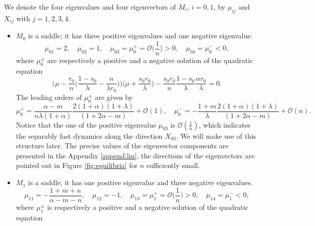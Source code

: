 \documentclass[a4paper,11pt]{article}
\def\BO{{\mathcal{O}}}
\theoremstyle{remark}
\begin{document}
We denote the four eigenvalues and four eigenvectors of $M_i$, $i=0,1$,  by $\mu_{ij}$ and $X_{ij}$ with $j=1,2,3,4$. %
\begin{itemize}
 \item $M_0$ is a saddle; it has three positive eigenvalues and one negative eigenvalue. 
 \begin{equation} \label{eq:eigM0}
  \mu_{01} = 2, \quad \mu_{02}=1, \quad \mu_{03}=\mu_0^+=\BO\Big(\frac{1}{n}\Big)>0, \quad \mu_{04}=\mu_0^{-}<0,
 \end{equation}
  where $\mu_0^\pm$ are respectively a positive and a negative solution of the quadratic equation
 $$ \Big(\mu - \frac{r_0}{n}\Big(\frac{1-s_0}{\lambda}-\frac{n}{\lambda r_0}\Big)\Big)\Big(\mu + \frac{s_0r_0}{\lambda}\Big) - \frac{s_0r_0}{n} \frac{1-s_0}{\lambda}\frac{\alpha r_0}{\lambda} = 0.$$
The leading orders of $\mu_0^\pm$ are given by
$$\mu_0^+ = \frac{\alpha-m}{n\lambda(1+\alpha)}\frac{2(1+\alpha)(1+\lambda)}{(1+2\alpha-m)}+\BO(1), \quad\mu_0^- = -\frac{1+m}{\lambda}\frac{2(1+\alpha)(1+\lambda)}{(1+2\alpha-m)}  + \BO(n).$$
Notice that the one of the positive eigenvalue $\mu_{03}$ is $\mathcal{O}( \frac{1}{n})$, which indicates the separably fast dynamics along the direction $X_{03}$. We will make use of this structure later.
The precise values of the eigenvector components are presented in the Appendix \ref{append:lin}, the directions of the eigenvectors are
pointed out in Figure \ref{fig:equilibria} for $n$ sufficiently small.
 \item $M_1$ is a saddle; it has one positive eigenvalue and three negative eigenvalues. 
\begin{equation} \label{eq:eigM1}
 \mu_{11}=-\frac{1+m+n}{\alpha-m-n}, \quad \mu_{12}=-1, \quad \mu_{13}=\mu_1^+=\BO\Big(\frac{1}{n}\Big)>0, \quad \mu_{14}=\mu_1^{-}<0,
\end{equation}
where $\mu_1^\pm$ is respectively a positive and a negative solution of the quadratic equation

\end{itemize}
\end{document}
